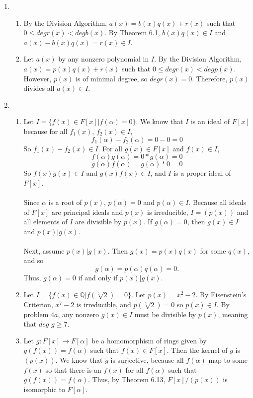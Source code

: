 \documentclass{article}
\begin{document}
\begin{enumerate}
\item
\begin{enumerate}
\item
By the Division Algorithm, $a(x) = b(x)q(x) + r(x)$ such that
$0 \leq deg r(x) < deg b(x)$.  By Theorem 6.1, $b(x)q(x) \in I$ and
$a(x) - b(x)q(x) = r(x) \in I$.

\item Let $a(x)$ by any nonzero polynomial in $I$.  By the Division Algorithm,
$a(x) = p(x)q(x) + r(x)$ such that $0 \leq deg r(x) < deg p(x)$.  However,
$p(x)$ is of minimal degree, so $deg r(x) = 0$.  Therefore, $p(x)$ divides
all $a(x) \in I$.

\end{enumerate}

\item
\begin{enumerate}
\item
Let $I = \{f(x) \in F[x] | f(\alpha) = 0\}$.  We know that $I$ is an ideal of
$F[x]$ because for all $f_{1}(x)$, $f_{2}(x) \in I$,
\[
f_{1}(\alpha) - f_{2}(\alpha) = 0-0 = 0
\]
So $f_{1}(x) - f_{2}(x) \in I$.  For all $g(x) \in F[x]$ and $f(x) \in I$,
\[
f(\alpha)g(\alpha) = 0*g(\alpha) = 0
\] \[
g(\alpha)f(\alpha) = g(\alpha)*0 = 0
\]
So $f(x)g(x) \in I$ and $g(x)f(x) \in I$, and $I$ is a proper ideal of $F[x]$.
\\ \\
Since $\alpha$ is a root of $p(x)$, $p(\alpha) = 0$ and $p(\alpha) \in I$.
Because all ideals of $F[x]$ are principal ideals and $p(x)$ is irreducible,
$I = (p(x))$ and all elements of $I$ are divisible by $p(x)$.  If $g(\alpha) = 0$,
then $g(x) \in I$ and $p(x) | g(x)$.
\\
\\
Next, assume $p(x) | g(x)$.  Then $g(x) = p(x)q(x)$ for some $q(x)$, and so
\[
g(\alpha) = p(\alpha)q(\alpha) = 0.
\]
Thus, $g(\alpha) = 0$ if and only if $p(x) | g(x)$.

\item Let $I = \{f(x) \in \mathbb{Q} | f(\sqrt[7]{2}) = 0\}$.
Let $p(x) = x^2 - 2$.  By Eisenstein's Criterion, $x^7 - 2$ is irreducible, and
$p(\sqrt[7]{2}) = 0$ so $p(x) \in I$.  By problem $4a$, any nonzero
$g(x) \in I$ must be divisible by $p(x)$, meaning that $deg$ $g \geq 7$.

\item Let $g:F[x] \rightarrow F[\alpha]$ be a homomorphism of rings
given by $g(f(x)) = f(\alpha)$ such that $f(x) \in F[x]$.  Then the kernel of
$g$ is $(p(x))$.  We know that $g$ is surjective, because all $f(\alpha)$ map to
some $f(x)$ so that there is an $f(x)$ for all $f(\alpha)$ such that
$g(f(x)) = f(\alpha)$.  Thus, by Theorem 6.13, $F[x]/(p(x))$ is isomorphic
to $F[\alpha]$.

\end{enumerate}
\end{enumerate}
\end{document}
